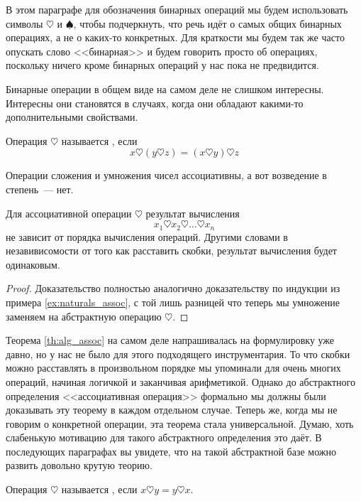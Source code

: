 В этом параграфе для обозначения бинарных операций мы будем использовать символы $\heartsuit$ и $\spadesuit$, чтобы подчеркнуть, что речь идёт о самых общих бинарных операциях, а не о каких-то конкретных. Для краткости мы будем так же часто опускать слово <<бинарная>> и будем говорить просто об операциях, поскольку ничего кроме бинарных операций у нас пока не предвидится.

Бинарные операции в общем виде на самом деле не слишком интересны. Интересны они становятся в случаях, когда они обладают какими-то дополнительными свойствами.

\begin{definition}
Операция $\heartsuit$ называется , если
$$x\heartsuit(y\heartsuit z) = (x\heartsuit y)\heartsuit z$$
\end{definition}

\begin{example}
Операции сложения и умножения чисел ассоциативны, а вот возведение в степень~--- нет.
\end{example}

\begin{thm}\label{th:alg_assoc}
Для ассоциативной операции $\heartsuit$ результат вычисления
$$x_1\heartsuit x_2\heartsuit\ldots\heartsuit x_n$$
не зависит от порядка вычисления операций. Другими словами в незавивисомости от того как расставить скобки, результат вычисления будет одинаковым.
\end{thm}
\begin{proof}
Доказательство полностью аналогично доказательству по индукции из примера \ref{ex:naturals_assoc}, с той лишь разницей что теперь мы умножение заменяем на абстрактную операцию $\heartsuit$.
\end{proof}

Теорема \ref{th:alg_assoc} на самом деле напрашивалась на формулировку уже давно, но у нас не было для этого подходящего инструментария. То что скобки можно расставлять в произвольном порядке мы упоминали для очень многих операций, начиная логичкой и заканчивая арифметикой. Однако до абстрактного определения <<ассоциативная операция>> формально мы должны были доказывать эту теорему в каждом отдельном случае. Теперь же, когда мы не говорим о конкретной операции, эта теорема стала универсальной. Думаю, хоть слабенькую мотивацию для такого абстрактного определения это даёт. В последующих параграфах вы увидете, что на такой абстрактной базе можно развить довольно крутую теорию.

\begin{definition}
Операция $\heartsuit$ называется , если $x\heartsuit y = y\heartsuit x$.
\end{definition}

